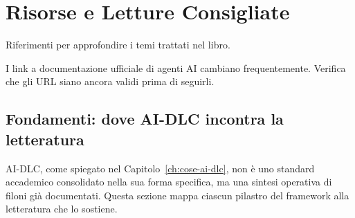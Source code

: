 ﻿%

\chapter{Risorse e Letture Consigliate}
\label{app:risorse}

Riferimenti per approfondire i temi trattati nel libro.

\begin{notebox}
I link a documentazione ufficiale di agenti AI cambiano frequentemente. Verifica che gli URL siano ancora validi prima di seguirli.
\end{notebox}

\section*{Fondamenti: dove AI-DLC incontra la letteratura}

AI-DLC, come spiegato nel Capitolo~\ref{ch:cose-ai-dlc}, non è uno standard accademico consolidato nella sua forma specifica, ma una sintesi operativa di filoni già documentati. Questa sezione mappa ciascun pilastro del framework alla letteratura che lo sostiene.

